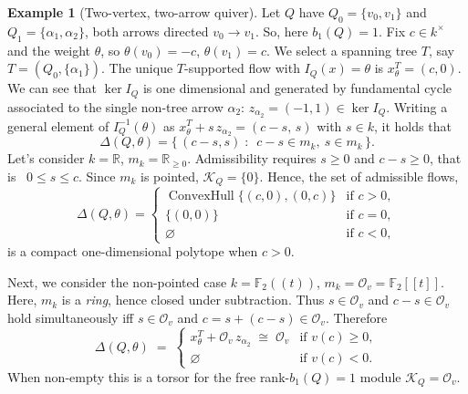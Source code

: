 \documentclass[12pt]{amsart}
\theoremstyle{plain}
\theoremstyle{definition}
\newtheorem{example}[theorem]{Example}
\begin{document}
\begin{example}[Two-vertex, two-arrow quiver]\label{ex:two-arrow}
Let $Q$ have $Q_0 = \{v_0, v_1\}$ and $Q_1 = \{\alpha_1, \alpha_2\}$, both arrows
directed $v_0 \to v_1$. So, here $b_1(Q) = 1$. Fix $c \in k^\times$ and the weight $\theta$, so
$\theta(v_0) = -c$, $\theta(v_1) = c$. 
We select a  spanning tree $T$, say $T= (Q_0, \{\alpha_1\})$. The unique $T$-supported flow
with $I_Q(x) = \theta$ is
$ x^T_\theta = (c, 0)$. We can see that 
$\ker I_Q$ is one dimensional and generated by  fundamental cycle associated to the
single non-tree arrow $\alpha_2$: $z_{\alpha_2} = (-1, 1) \in \ker I_Q$. 
Writing a general element of
$I_Q^{-1}(\theta)$ as $x^T_\theta + s\,z_{\alpha_2} = (c - s,\, s)$ with $s \in k$,
it holds that
\[
  \Delta(Q,\theta)
  = \bigl\{\, (c-s,s) \;:\; \ c - s \in m_k,\ s \in m_k \,\bigr\}.
\]
\medskip
Let's consider $k = \mathbb{R}$, $m_k = \mathbb{R}_{\geq 0}$.
Admissibility requires $s \geq 0$ and $c - s \geq 0$, that is \ $0 \leq s \leq c$.
Since $m_k$ is pointed, $\mathcal{K}_Q = 
\{0\}$. Hence, the set of admissible flows,
\[
  \Delta(Q,\theta) =
  \begin{cases}
    \operatorname{ConvexHull}\{(c,0),(0,c)\} & \text{if } c > 0,\\
    \{(0,0)\}                                & \text{if } c = 0,\\
    \varnothing                              & \text{if } c < 0,
  \end{cases}
\]
is a compact one-dimensional polytope when $c > 0$.  

Next, we consider the non-pointed case $k = \mathbb{F}_2((t))$,
$m_k = \mathcal{O}_v = \mathbb{F}_2[[t]]$. 
Here, $m_k$ is a \emph{ring}, hence closed under subtraction. Thus
$s \in \mathcal{O}_v$ and $c - s \in \mathcal{O}_v$ hold simultaneously iff
$s \in \mathcal{O}_v$ and $c = s + (c - s) \in \mathcal{O}_v$. Therefore
\[
  \Delta(Q,\theta) \;=\;
  \begin{cases}
    x^T_\theta + \mathcal{O}_v\, z_{\alpha_2} \;\cong\; \mathcal{O}_v & \text{if } v(c) \geq 0,\\
    \varnothing & \text{if } v(c) < 0.
  \end{cases}
\]
When non-empty this is a torsor for the free rank-$b_1(Q) = 1$ module
$\mathcal{K}_Q = \mathcal{O}_v$. 


\end{example}
\end{document}
